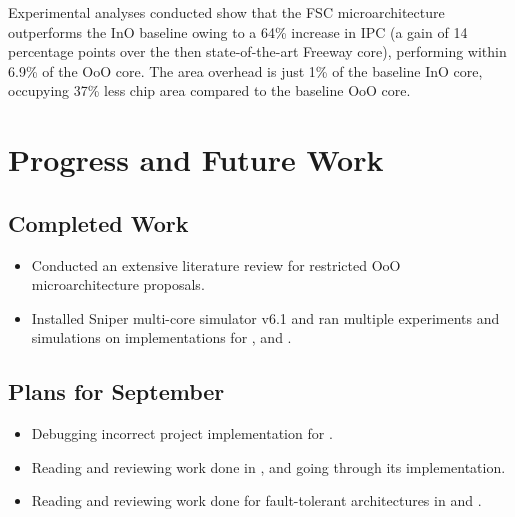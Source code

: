 \documentclass[a4paper,12pt, final]{report}
\begin{document}
Experimental analyses conducted show that the FSC microarchitecture outperforms the InO baseline owing to a 64\% increase in IPC (a gain of 14 percentage points over the then state-of-the-art Freeway\cite{freeway} core), performing within 6.9\% of the OoO core. The area overhead is just 1\% of the baseline InO core, occupying 37\% less chip area compared to the baseline OoO core.


\chapter{Progress and Future Work}

\section{Completed Work}

\begin{itemize}
    \item Conducted an extensive literature review for restricted OoO microarchitecture proposals.
    \item Installed Sniper multi-core simulator v6.1 and ran multiple experiments and simulations on implementations for \cite{loadslice}, \cite{freeflow} and \cite{forwardslice}.
\end{itemize}

\section{Plans for September}

\begin{itemize}
    \item Debugging incorrect project implementation for \cite{forwardslice}.
    \item Reading and reviewing work done in \cite{fxa}, and going through its implementation.
    \item Reading and reviewing work done for fault-tolerant architectures in \cite{remo} and \cite{remora}.
\end{itemize}


{}
\end{document}
